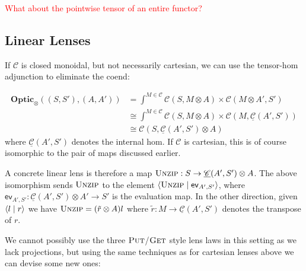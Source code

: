 \documentclass[11pt,letterpaper]{article}
\theoremstyle{plain}
\theoremstyle{definition}
\newtheorem{remark}[theorem]{Remark}
\newcommand{\C}{\mathscr{C}}
\newcommand{\homC}{\underline{\C}}
\newcommand{\Optic}{\mathbf{Optic}}
\newcommand{\rep}[2]{{\ensuremath \left\langle #1 \mid #2 \right\rangle}}
\newcommand{\fget}{\textsc{Get}}
\newcommand{\fput}{\textsc{Put}}
\newcommand{\funzip}{\textsc{Unzip}}
\newcommand{\todo}[1]{\textcolor{red}{\small #1}}
\begin{document}

\todo{What about the pointwise tensor of an entire functor?}

\subsection{Linear Lenses}\label{sec:linear-lenses}
\newcommand{\ev}{\mathsf{ev}}
\newcommand{\coev}{\mathsf{coev}}

If $\C$ is closed monoidal, but not necessarily cartesian, we can use the tensor-hom adjunction to eliminate the coend:

\begin{align*}
  \Optic_\otimes((S, S'), (A, A')) &= \int^{M \in \C} \C(S, M \otimes A) \times \C(M \otimes A', S') \\
                                   &\cong \int^{M \in \C} \C(S, M \otimes A) \times \C(M, \homC(A',S')) \\
                                   &\cong \C(S, \homC(A',S') \otimes A)
\end{align*}
where $\homC(A', S')$ denotes the internal hom. If $\C$ is cartesian, this is of course isomorphic to the pair of maps discussed earlier.

A concrete linear lens is therefore a map $\funzip : S \to \homC(A',S') \otimes A$. The above isomorphism sends $\funzip$ to the element $\rep{\funzip}{\ev_{A', S'}}$, where $\ev_{A', S'} : \homC(A',S') \otimes A' \to S'$ is the evaluation map. In the other direction, given $\rep{l}{r}$ we have $\funzip = (\tilde r \otimes A)l$ where $\tilde r : M \to \homC(A', S')$ denotes the transpose of $r$.

We cannot possibly use the three $\fput$/$\fget$ style lens laws in this setting as we lack projections, but using the same techniques as for cartesian lenses above we can devise some new ones:
\end{document}
